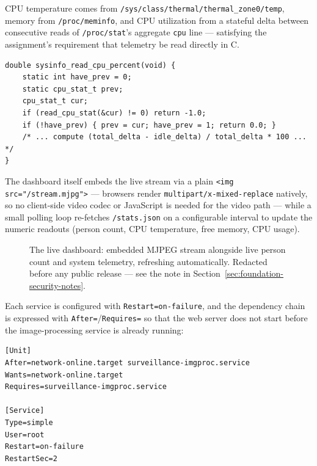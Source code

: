 CPU temperature
comes from \texttt{/sys/class/thermal/thermal\_zone0/temp}, memory from
\texttt{/proc/meminfo}, and CPU utilization from a stateful delta between
consecutive reads of \texttt{/proc/stat}'s aggregate \texttt{cpu} line ---
satisfying the assignment's requirement that telemetry be read directly in
C.

\begin{lstlisting}[style=cstyle_bright_2026, caption={CPU utilization computed as a delta between two \texttt{/proc/stat} samples --- the first call always returns 0.0 since no prior sample exists yet, which is expected, documented behavior.}, label={code:cpu-percent}]
double sysinfo_read_cpu_percent(void) {
    static int have_prev = 0;
    static cpu_stat_t prev;
    cpu_stat_t cur;
    if (read_cpu_stat(&cur) != 0) return -1.0;
    if (!have_prev) { prev = cur; have_prev = 1; return 0.0; }
    /* ... compute (total_delta - idle_delta) / total_delta * 100 ... */
}
\end{lstlisting}

The dashboard itself embeds the live stream via a plain \texttt{<img
src="/stream.mjpg">} --- browsers render \texttt{multipart/x-mixed-replace}
natively, so no client-side video codec or JavaScript is needed for the
video path --- while a small polling loop re-fetches \texttt{/stats.json}
on a configurable interval to update the numeric readouts (person count,
CPU temperature, free memory, CPU usage).

\begin{figure}[H]
\centering
\caption{The live dashboard: embedded MJPEG stream alongside live person count and system telemetry, refreshing automatically. \alert{Redacted before any public release} --- see the note in Section~\ref{sec:foundation-security-notes}.}\label{fig:webpage-demo}
\end{figure}


Each service is configured with \texttt{Restart=on-failure}, and the
dependency chain is expressed with \texttt{After=}/\texttt{Requires=} so
that the web server does not start before the image-processing service is
already running:

\begin{lstlisting}[caption={\texttt{surveillance-web.service} --- dependency declaration.}, label={code:web-service-unit}]
[Unit]
After=network-online.target surveillance-imgproc.service
Wants=network-online.target
Requires=surveillance-imgproc.service

[Service]
Type=simple
User=root
Restart=on-failure
RestartSec=2
\end{lstlisting}


